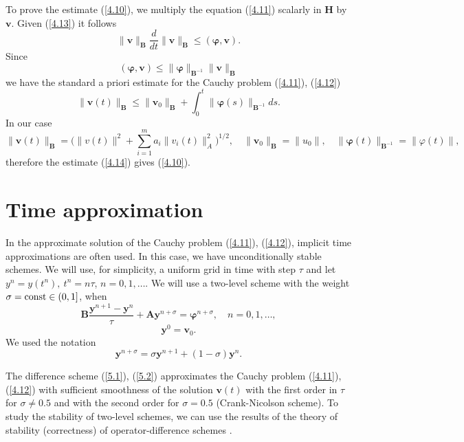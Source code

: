 \documentclass[3p]{elsarticle}
\newcommand{\const}{\mathop{\rm const}\nolimits}
\numberwithin{equation}{section}
\begin{document}
To prove the estimate (\ref{4.10}), we multiply the equation (\ref{4.11}) scalarly in $\bm H$ by $\bm v$.
Given (\ref{4.13}) it follows
\[
 \|\bm v\|_{\bm B} \frac{d}{d t}  \|\bm v\|_{\bm B} \leq (\bm \varphi , \bm v) .  
\]
Since
\[
 (\bm \varphi , \bm v) \leq \|\bm \varphi \|_{\bm B^{-1}} \|\bm v\|_{\bm B} 
\] 
we have the standard a priori estimate for the Cauchy problem (\ref{4.11}), (\ref{4.12}) 
\begin{equation}\label{4.14}
 \|\bm v(t)\|_{\bm B} \leq \|\bm v_0\|_{\bm B} + \int_{0}^{t} \|\bm \varphi(s)\|_{\bm B^{-1}} d s .
\end{equation} 
In our case
\[
 \|\bm v(t)\|_{\bm B} = \Big (\|v(t)\|^2 + \sum_{i=1}^{m} a_i \|v_i(t)\|_{A}^2 \Big)^{1/2} , 
 \quad \|\bm v_0\|_{\bm B} = \|u_0\| ,
 \quad \|\bm \varphi(t)\|_{\bm B^{-1}} = \|\varphi(t)\|,
\] 
therefore the estimate (\ref{4.14}) gives (\ref{4.10}).

\section{Time approximation}\label{sec:5} 

In the approximate solution of the Cauchy problem (\ref{4.11}), (\ref{4.12}),  implicit time approximations are often used.
In this case, we have unconditionally stable schemes. 
We will use, for simplicity, a uniform grid in time with step $\tau$ and let  $y^n=y(t^n), \ t^n = n\tau$, $n =0, 1, \ldots$. 
We will use a two-level scheme with the weight $\sigma = \const \in (0,1]$, when 
\begin{equation}\label{5.1}
 \bm B \frac{\bm y^{n+1} - \bm y^{n}}{\tau } + \bm A \bm y^{n+\sigma} = \bm \varphi^{n+\sigma},
 \quad n = 0,1,\ldots,
\end{equation} 
\begin{equation}\label{5.2}
 \bm y^0 = \bm v_0 .
\end{equation} 
We used the notation
\[
 \bm y^{n+\sigma} = \sigma \bm y^{n+1} + (1-\sigma ) \bm y^{n} .
\] 

The difference scheme (\ref{5.1}), (\ref{5.2}) approximates the Cauchy problem (\ref{4.11}), (\ref{4.12}) with sufficient smoothness of the solution $\bm v(t)$ with the first order in $\tau$ for $\sigma \neq 0.5$ and with the second order for $\sigma = 0.5$ (Crank-Nicolson scheme).
To study the stability of two-level schemes, we can use the results of the theory of stability (correctness) of operator-difference schemes \cite{SamarskiiTheory,SamarskiiMatusVabischevich2002}.
\end{document}
